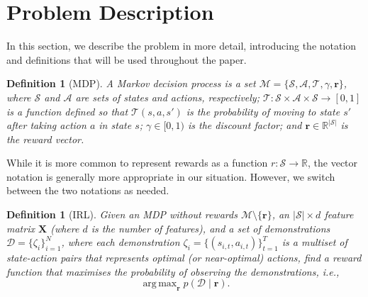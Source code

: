 \documentclass{mpaper}
\newtheorem{definition}[theorem]{Definition}
\DeclareMathOperator*{\argmax}{arg\,max}
\begin{document}
\section{Problem Description} \label{sec:problem}

In this section, we describe the problem in more detail, introducing the
notation and definitions that will be used throughout the paper.

\begin{definition}[MDP]
  A \emph{Markov decision process} is a set $\mathcal{M} = \{ \mathcal{S},
  \mathcal{A}, \mathcal{T}, \gamma, \mathbf{r} \}$, where $\mathcal{S}$ and
  $\mathcal{A}$ are sets of states and actions, respectively; $\mathcal{T}
  \colon \mathcal{S} \times \mathcal{A} \times \mathcal{S} \to [0, 1]$ is a
  function defined so that $\mathcal{T}(s, a, s')$ is the probability of moving
  to state $s'$ after taking action $a$ in state $s$; $\gamma \in [0, 1)$ is the
  discount factor; and $\mathbf{r} \in \mathbb{R}^{|\mathcal{S}|}$ is the reward
  vector.
\end{definition}

While it is more common to represent rewards as a function $r \colon \mathcal{S}
\to \mathbb{R}$, the vector notation is generally more appropriate in our
situation. However, we switch between the two notations as needed.

\begin{definition}[IRL]
  Given an MDP without rewards $\mathcal{M} \setminus \{ \mathbf{r} \}$, an
  $|\mathcal{S}| \times d$ feature matrix $\mathbf{X}$ (where $d$ is the number
  of features), and a set of \emph{demonstrations} $\mathcal{D} = \{\zeta_i
  \}_{i=1}^N$, where each demonstration $\zeta_i = \{ (s_{i,t}, a_{i,t})
  \}_{t=1}^T$ is a multiset of state-action pairs that represents optimal (or
  near-optimal) actions, find a reward function that maximises the probability
  of observing the demonstrations, i.e.,
  \[
    \argmax_{\mathbf{r}} p(\mathcal{D} \mid \mathbf{r}).
  \]
\end{definition}
\end{document}

